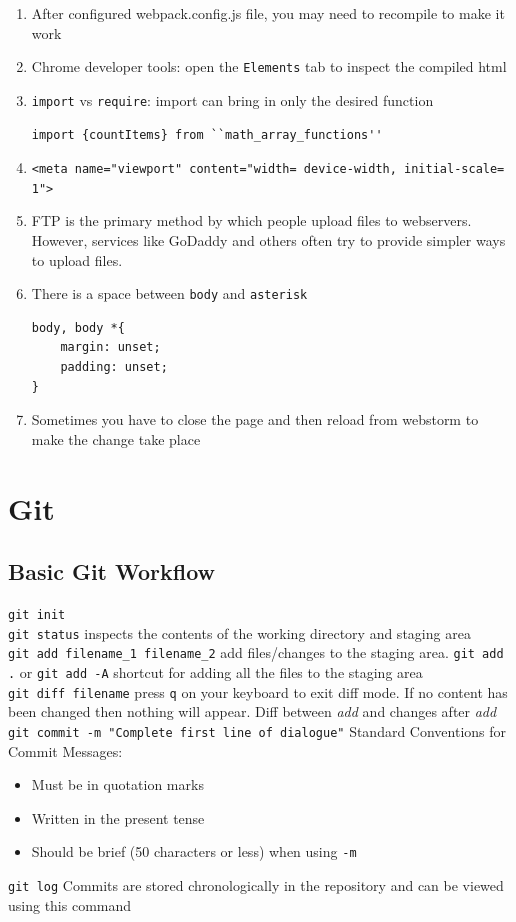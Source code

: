 \documentclass[a4paper, 12pt]{article}
\begin{document}
\begin{enumerate}
\item After configured webpack.config.js file, you may need to recompile to make it work

\item Chrome developer tools: open the \verb|Elements| tab to inspect the compiled html

\item \verb|import| vs \verb|require|: import can bring in only the desired function
\begin{verbatim}
import {countItems} from ``math_array_functions''
\end{verbatim}

\item \verb|<meta name="viewport" content="width= device-width, initial-scale= 1">|

\item  FTP is the primary method by which people upload files to webservers. However, services like GoDaddy and others often try to provide simpler ways to upload files.

\item There is a space between \verb|body| and \verb|asterisk|
\begin{verbatim}
body, body *{
    margin: unset;
    padding: unset;
}
\end{verbatim}

\item Sometimes you have to close the page and then reload from webstorm to make the change take place
\end{enumerate}


\section{Git}
\subsection{Basic Git Workflow}
\noindent\verb|git init|\\
\verb|git status| inspects the contents of the working directory and staging area\\
\verb|git add filename_1 filename_2| add files/changes to the staging area. \verb|git add .| or \verb|git add -A| shortcut for adding all the files to the staging area \\
\verb|git diff filename| press \verb|q| on your keyboard to exit diff mode. If no content has been changed then nothing will appear. Diff between \textit{add} and changes after \textit{add} \\ 
\verb|git commit -m "Complete first line of dialogue"| Standard Conventions for Commit Messages:
\begin{itemize}
\item Must be in quotation marks
\item Written in the present tense
\item Should be brief (50 characters or less) when using \verb|-m|
\end{itemize}
\verb|git log| Commits are stored chronologically in the repository and can be viewed using this command
\end{document}
